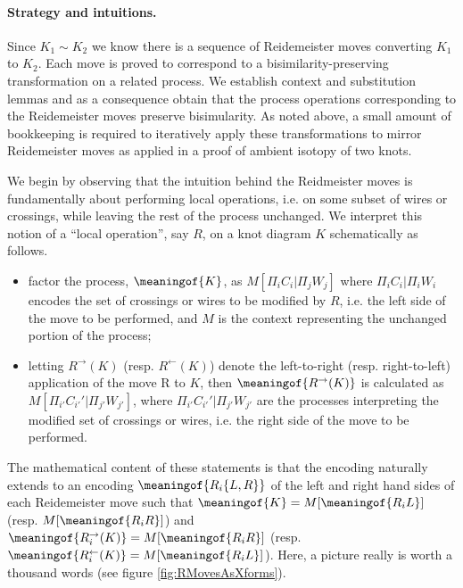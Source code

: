 \paragraph*{Strategy and intuitions.} Since $K_1 \sim K_2$ we know
there is a sequence of Reidemeister moves converting $K_1$ to 
$K_2$. Each move is proved to correspond to a bisimilarity-preserving
transformation on a related process. We establish context and
substitution lemmas and as a consequence obtain that the process operations
corresponding to the Reidemeister moves preserve bisimularity. As
noted above, a small amount of bookkeeping is required to iteratively
apply these transformations to mirror Reidemeister moves as applied in a
proof of ambient isotopy of two knots.

We begin by observing that the intuition behind the Reidmeister moves
is fundamentally about performing local operations, i.e. on
some subset of wires or crossings, while leaving the rest of the
process unchanged. We interpret this notion of a ``local operation'',
say $R$, on a knot diagram $K$ schematically as follows.

\begin{itemize}
\item factor the process, $\meaningof{K}$, as $M[\Pi_iC_i | \Pi_jW_j]$
  where $\Pi_iC_i | \Pi_iW_i$ encodes the set of crossings or wires
  to be modified by $R$, i.e. the left side of the move to be
  performed, and $M$ is the context representing the unchanged portion of the process;
\item letting $R^{\to}(K)$ (resp. $R^{\leftarrow}(K)$) denote the
  left-to-right (resp. right-to-left) application of the move R to
  $K$, then $\meaningof{R^{\to}(K)}$ is calculated as
  $M[\Pi_{i'}C_{i'}' | \Pi_{j'}W_{j'}]$, where $\Pi_{i'}C_{i'}' |
  \Pi_{j'}W_{j'}$ are the processes interpreting the modified set of
  crossings or wires, i.e. the right side of the move to be performed.
\end{itemize}

The mathematical content of these statements is that the encoding
naturally extends to an encoding $\meaningof{R_{i}\{L,R\}}$ of the left and right hand sides of each
Reidemeister move such that $\meaningof{K} =
M[\meaningof{R_{i}L}]$ (resp. $M[\meaningof{R_{i}R}]$) and
$\meaningof{R_{i}^{\to}(K)} = M[\meaningof{R_{i}R}]$
(resp. $\meaningof{R_{i}^{\leftarrow}(K)} = M[\meaningof{R_{i}L}]$). Here, a picture really is worth a thousand words (see figure
\ref{fig:RMovesAsXforms}).  

